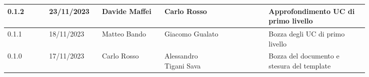 {\begin{longtable}{p{0.10\linewidth}p{0.10\linewidth}p{0.15\linewidth}p{0.15\linewidth}p{0.10\linewidth}p{0.24\linewidth}}
	  \hline
	  0.1.2             & 23/11/2023    & Davide Maffei          & Carlo Rosso            &                        & Approfondimento UC di primo livello                                      \\
	  \hline
	  0.1.1             & 18/11/2023    & Matteo Bando           & Giacomo Gualato        &                        & Bozza degli UC di primo livello                                          \\
	  \hline
	  0.1.0             & 17/11/2023    & Carlo Rosso            & Alessandro Tigani Sava &                        & Bozza del documento e stesura del template                               \\
  \end{longtable}
 }
